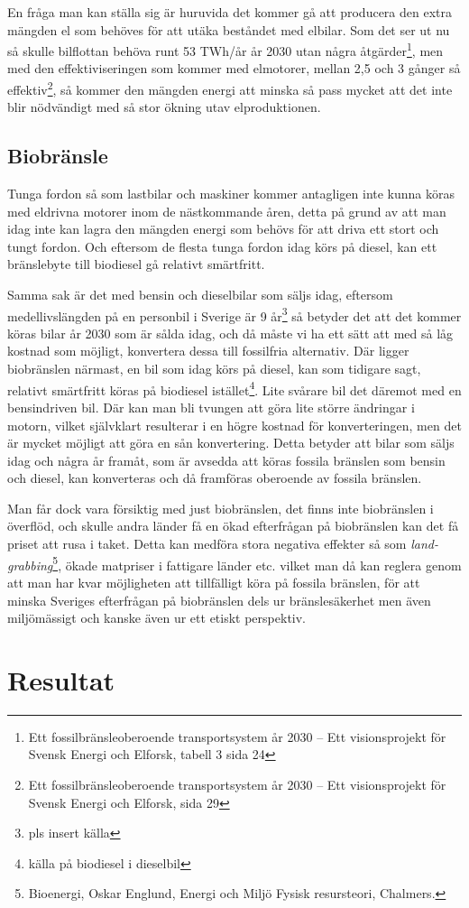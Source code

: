 \documentclass[a4paper,11pt,fleqn, titlepage]{article}
\begin{document}
En fråga man kan ställa sig är huruvida det kommer gå att producera den
extra mängden el som behöves för att utäka beståndet med elbilar. Som det
ser ut nu så skulle bilflottan behöva runt 53 TWh/år år 2030 utan några
åtgärder\footnote{Ett fossilbränsleoberoende transportsystem år 2030 – Ett
visionsprojekt för Svensk Energi och Elforsk, tabell 3 sida 24}, men med
den effektiviseringen som kommer med elmotorer, mellan 2,5 och 3 gånger så
effektiv\footnote{Ett fossilbränsleoberoende transportsystem år 2030 – Ett
visionsprojekt för Svensk Energi och Elforsk, sida 29}, så kommer den
mängden energi att minska så pass mycket att det inte blir nödvändigt med
så stor ökning utav elproduktionen.

\subsection{Biobränsle}
Tunga fordon så som lastbilar och maskiner kommer antagligen inte kunna
köras med eldrivna motorer inom de nästkommande åren, detta på grund av att
man idag inte kan lagra den mängden energi som behövs för att driva ett
stort och tungt fordon. Och eftersom de flesta tunga fordon idag körs på
diesel, kan ett bränslebyte till biodiesel gå relativt smärtfritt.

Samma sak är det med bensin och dieselbilar som säljs idag, eftersom
medellivslängden på en personbil i Sverige är 9 år\footnote{pls insert
källa} så betyder det att det kommer köras bilar år 2030 som är sålda idag,
och då måste vi ha ett sätt att med så låg kostnad som möjligt, konvertera
dessa till fossilfria alternativ. Där ligger biobränslen närmast, en bil
som idag körs på diesel, kan som tidigare sagt, relativt smärtfritt köras
på biodiesel istället\footnote{källa på biodiesel i dieselbil}. Lite
svårare bil det däremot med en bensindriven bil. Där kan man bli tvungen
att göra lite större ändringar i motorn, vilket självklart resulterar i en
högre kostnad för konverteringen, men det är mycket möjligt att göra en sån
konvertering. Detta betyder att bilar som säljs idag och några år framåt,
som är avsedda att köras fossila bränslen som bensin och diesel, kan
konverteras och då framföras oberoende av fossila bränslen.

Man får dock vara försiktig med just biobränslen, det finns inte
biobränslen i överflöd, och skulle andra länder få en ökad efterfrågan på
biobränslen kan det få priset att rusa i taket. Detta kan medföra stora
negativa effekter så som \emph{land-grabbing}\footnote{Bioenergi, Oskar
Englund, Energi och Miljö Fysisk resursteori, Chalmers.}, ökade matpriser i
fattigare länder etc. vilket man då kan reglera genom att man har kvar
möjligheten att tillfälligt köra på fossila bränslen, för att minska
Sveriges efterfrågan på biobränslen dels ur bränslesäkerhet men även
miljömässigt och kanske även ur ett etiskt perspektiv.

\section{Resultat}
\end{document}
